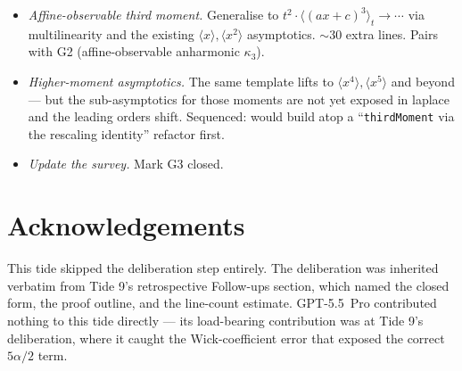 \documentclass[11pt]{article}
\begin{document}
\begin{itemize}
\item \emph{Affine-observable third moment.} Generalise to
$t^2 \cdot \langle (a x + c)^3 \rangle_t \to \cdots$ via multilinearity
and the existing $\langle x \rangle, \langle x^2 \rangle$ asymptotics.
$\sim$30 extra lines. Pairs with G2 (affine-observable anharmonic
$\kappa_3$).
\item \emph{Higher-moment asymptotics.} The same template lifts to
$\langle x^4 \rangle, \langle x^5 \rangle$ and beyond — but the
sub-asymptotics for those moments are not yet exposed in laplace and
the leading orders shift. Sequenced: would build atop a
``\texttt{thirdMoment} via the rescaling identity'' refactor first.
\item \emph{Update the survey.} Mark G3 closed.
\end{itemize}

\section*{Acknowledgements}

This tide skipped the deliberation step entirely. The deliberation
was inherited verbatim from Tide 9's retrospective Follow-ups section,
which named the closed form, the proof outline, and the line-count
estimate. GPT-5.5~Pro contributed nothing to this tide directly —
its load-bearing contribution was at Tide 9's deliberation, where it
caught the Wick-coefficient error that exposed the correct
$5\alpha/2$ term.
\end{document}
